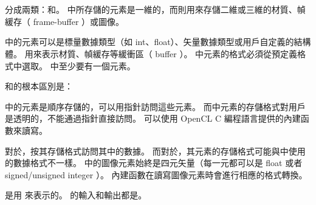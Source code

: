 \startbuffer[sectitlememobj]
\stopbuffer
\section{\getbuffer[sectitlememobj]}
分成兩類：和。
中所存儲的元素是一維的，而則用來存儲二維或三維的材質、幀緩存（ frame-buffer ）或圖像。

中的元素可以是標量數據類型（如 int、float）、矢量數據類型或用戶自定義的結構體。
用來表示材質、幀緩存等緩衝區（ buffer ）。
中元素的格式必須從預定義格式中選取。
中至少要有一個元素。

和的根本區別是：
\startigBase
\item {}中的元素是順序存儲的，可以用指針訪問這些元素。
而中元素的存儲格式對用戶是透明的，不能通過指針直接訪問。
可以使用 OpenCL C 編程語言提供的內建函數來讀寫。

\item 對於，按其存儲格式訪問其中的數據。
而對於，其元素的存儲格式可能與中使用的數據格式不一樣。
中的圖像元素始終是四元矢量（每一元都可以是 float 或者 signed/unsigned integer ）。
內建函數在讀寫圖像元素時會進行相應的格式轉換。
\stopigBase

是用 {} 來表示的。
的輸入和輸出都是。

